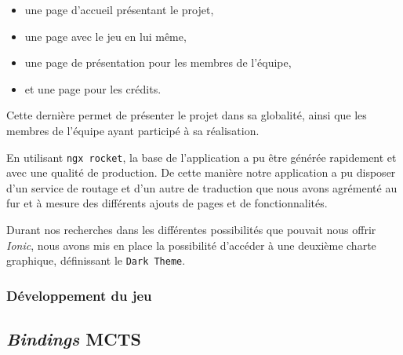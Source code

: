 \documentclass[a4paper,11pt]{article}
\providecommand{\tightlist}{%
  \setlength{\itemsep}{0pt}\setlength{\parskip}{0pt}}
\begin{document}
\begin{itemize}
\tightlist
\item
  une page d'accueil présentant le projet,
\item
  une page avec le jeu en lui même,
\item
  une page de présentation pour les membres de l'équipe,
\item
  et une page pour les crédits.
\end{itemize}

Cette dernière permet de présenter le projet dans sa globalité, ainsi
que les membres de l'équipe ayant participé à sa réalisation.

En utilisant \texttt{ngx\ rocket}, la base de l'application a pu être
générée rapidement et avec une qualité de production. De cette manière
notre application a pu disposer d'un service de routage et d'un autre de
traduction que nous avons agrémenté au fur et à mesure des différents
ajouts de pages et de fonctionnalités.

Durant nos recherches dans les différentes possibilités que pouvait nous
offrir \emph{Ionic}, nous avons mis en place la possibilité d'accéder à
une deuxième charte graphique, définissant le \texttt{Dark\ Theme}.

\hypertarget{duxe9veloppement-du-jeu}{%
\subsubsection{Développement du jeu}\label{duxe9veloppement-du-jeu}}

\hypertarget{bindings-mcts}{%
\subsection{\texorpdfstring{\emph{Bindings}
MCTS}{Bindings MCTS}}\label{bindings-mcts}}

% 

\end{document}
